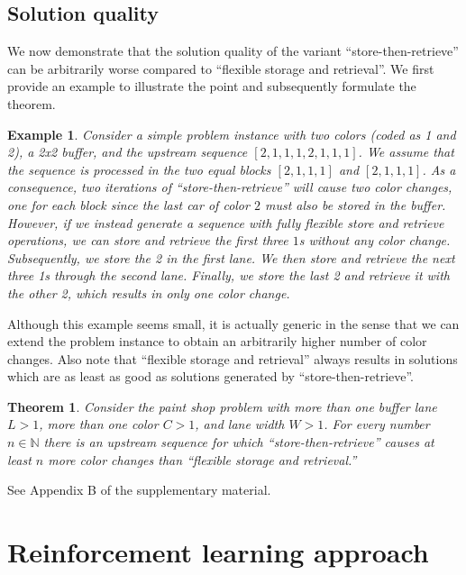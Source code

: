 \documentclass[11pt]{elsarticle}
\newtheorem{thm}{Theorem}
\newtheorem{ex}{Example}
\begin{document}
\subsection{Solution quality}
\label{section:Solution-quality}

We now demonstrate that the solution quality of the variant ``store-then-retrieve'' can be arbitrarily worse compared to ``flexible storage and retrieval''. We first provide an example to illustrate the point and subsequently formulate the theorem.

\begin{ex}
\normalfont
Consider a simple problem instance with two colors (coded as 1 and 2), a 2x2 buffer, and the upstream sequence $[2,1,1,1,2,1,1,1]$. We assume that the sequence is processed in the two equal blocks $[2,1,1,1]$ and $[2,1,1,1]$. As a consequence, two iterations of ``store-then-retrieve'' will cause two color changes, one for each block since the last car of color $2$ must also be stored in the buffer. 
However, if we instead generate a sequence with fully flexible store and retrieve operations, we can store and retrieve the first three $1$s without any color change. Subsequently, we store the 2 in the first lane. We then store and retrieve the next three 1s through the second lane. Finally, we store the last 2 and retrieve it with the other 2, which results in only one color change.
\end{ex}
Although this example seems small, it is actually generic in the sense that we can extend the problem instance to obtain an arbitrarily higher number of color changes.
Also note that ``flexible storage and retrieval'' always results in solutions which are as least as good as solutions generated by ``store-then-retrieve''.
\begin{thm}
Consider the paint shop problem with more than one buffer lane $L > 1$, more than one color $C>1$, and lane width $W > 1$. 
For every number $n\in \mathbb{N}$ there is an upstream sequence for which ``store-then-retrieve'' causes at least $n$ more color changes than ``flexible storage and retrieval.''
\end{thm}
\begin{pf}
See Appendix B of the supplementary material.
\end{pf}


\section{Reinforcement learning approach}
\label{section-RL-approach}
\end{document}
